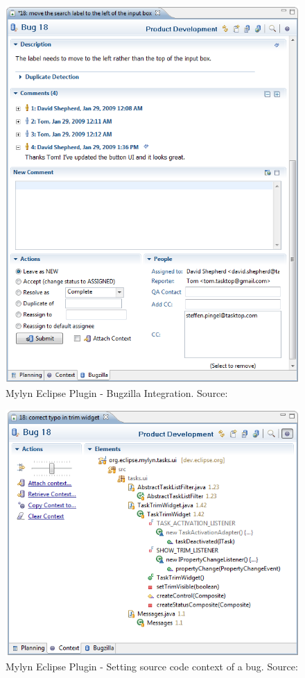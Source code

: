 \begin{figure}[ht]
	\centering
	\includegraphics[width=\textwidth]{Mylyn-comment.png}
    \caption{Mylyn Eclipse Plugin - Bugzilla Integration. Source: \cite{mylyn}}
	\label{fig:mylyn}
\end{figure}

\begin{figure}[ht]
	\centering
	\includegraphics[width=\textwidth]{Mylyn-context.png}
    \caption{Mylyn Eclipse Plugin - Setting source code context of a bug. Source: \cite{mylyn}}
	\label{fig:mylyn}
\end{figure}

